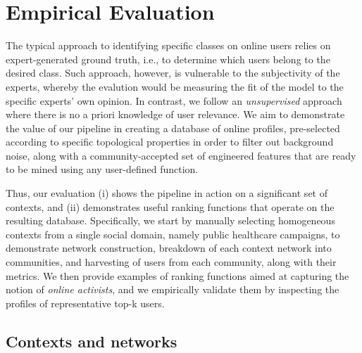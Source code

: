 \documentclass[runningheads]{llncs}
\begin{document}
\section{Empirical Evaluation} \label{sec:evaluation}

The typical approach to identifying specific classes on online users relies on expert-generated ground truth, i.e., to determine which users belong to the desired class. 
Such approach, however, is vulnerable to  the subjectivity of the experts, whereby the evalution would  be measuring the fit of the model to the specific experts' own opinion. 
In contrast, we follow an \textit{unsupervised} approach where there is no a priori knowledge of user relevance.  
We aim to demonstrate the value of our pipeline in creating a database of online profiles, pre-selected according to specific topological properties in order to filter out background noise,  along with a community-accepted set of engineered features that are ready to be mined using any user-defined function.

Thus, our evaluation (i) shows the pipeline in action on a significant set of contexts, and (ii) demonstrates useful ranking functions that operate on the resulting database.
Specifically, we  start by manually selecting homogeneous contexts from a single social domain, namely public healthcare campaigns, to demonstrate network construction, breakdown of each  context network into communities, and harvesting of users from each community, along with their metrics.
We then provide examples of ranking functions aimed at capturing the notion of  \textit{online activists}, and we empirically validate them by inspecting the profiles of representative top-k users.



 \subsection{Contexts and networks}  \label{sec:contexts}
 
\end{document}
